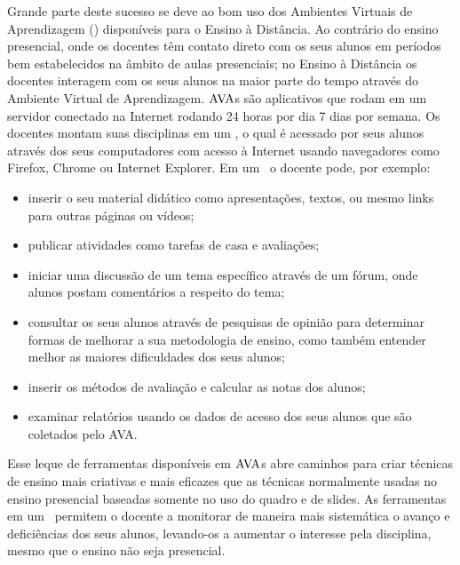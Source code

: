 

Grande parte deste sucesso se deve ao bom uso dos Ambientes Virtuais de Aprendizagem (\ava) disponíveis para
o Ensino à Distância. Ao contrário do ensino presencial, onde os docentes têm contato direto 
com os seus alunos em períodos bem estabelecidos na âmbito de aulas presenciais; 
no Ensino à Distância os docentes interagem com os seus alunos na maior parte do tempo 
através do Ambiente Virtual de Aprendizagem. $\hbox{AVA}$s são aplicativos que rodam em um servidor 
conectado na Internet rodando 24 horas por dia 7 dias por semana. Os docentes montam suas disciplinas em um \ava, o qual é acessado 
por seus alunos através dos seus computadores com acesso à Internet usando navegadores como Firefox, Chrome ou Internet Explorer. 
Em um \ava\ o docente pode, por exemplo:
\begin{itemize}
 \item inserir o seu material didático como apresentações, textos, ou mesmo links para outras páginas ou vídeos;
 \item publicar atividades como tarefas de casa e avaliações;
 \item iniciar uma discussão de um tema específico através de um fórum, onde alunos postam comentários a 
 respeito do tema;
 \item consultar os seus alunos através de pesquisas de opinião para determinar
formas de melhorar a sua metodologia de ensino, como também entender melhor as
maiores dificuldades dos seus alunos;
 \item inserir os métodos de avaliação e calcular as notas dos alunos;
 \item examinar relatórios usando os dados de acesso dos seus alunos que são 
coletados pelo AVA.
\end{itemize}
Esse leque de ferramentas disponíveis em $\hbox{AVA}$s abre caminhos para criar técnicas de ensino 
mais criativas e mais eficazes que as técnicas normalmente usadas no ensino presencial 
baseadas somente no uso do quadro e de slides. As ferramentas em um \ava\ permitem  
o docente a monitorar de maneira mais sistemática o avanço e deficiências dos seus alunos, 
levando-os a aumentar o interesse pela disciplina, mesmo que o ensino não seja presencial. 

